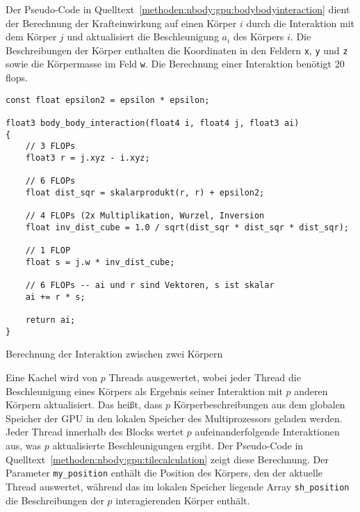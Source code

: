 Der Pseudo-Code in Quelltext~\ref{methoden:nbody:gpu:bodybodyinteraction}
dient der Berechnung der Krafteinwirkung auf einen Körper $i$ durch die
Interaktion mit dem Körper $j$ und aktualisiert die Beschleunigung $a_i$ des
Körpers $i$. Die Beschreibungen der Körper enthalten die Koordinaten in den
Feldern \texttt{x}, \texttt{y} und \texttt{z} sowie die Körpermasse im Feld
\texttt{w}. Die Berechnung einer Interaktion benötigt 20 \glspl{flop}.

\begin{code}
    \begin{verbatim}
const float epsilon2 = epsilon * epsilon;

float3 body_body_interaction(float4 i, float4 j, float3 ai)
{
    // 3 FLOPs
    float3 r = j.xyz - i.xyz;

    // 6 FLOPs
    float dist_sqr = skalarprodukt(r, r) + epsilon2;

    // 4 FLOPs (2x Multiplikation, Wurzel, Inversion 
    float inv_dist_cube = 1.0 / sqrt(dist_sqr * dist_sqr * dist_sqr);

    // 1 FLOP
    float s = j.w * inv_dist_cube;

    // 6 FLOPs -- ai und r sind Vektoren, s ist skalar
    ai += r * s;

    return ai;
}
    \end{verbatim}
    \caption{Berechnung der Interaktion zwischen zwei Körpern}
    \label{methoden:nbody:gpu:bodybodyinteraction}
\end{code}

Eine Kachel wird von $p$ Threads ausgewertet, wobei jeder Thread die
Beschleunigung eines Körpers als Ergebnis seiner Interaktion mit $p$ anderen
Körpern aktualisiert. Das heißt, dass $p$ Körperbeschreibungen aus dem globalen
Speicher der GPU in den lokalen Speicher des Multiprozessors geladen werden.
Jeder Thread innerhalb des Blocks wertet $p$ aufeinanderfolgende Interaktionen
aus, was $p$ aktualisierte Beschleunigungen ergibt. Der Pseudo-Code in
Quelltext~\ref{methoden:nbody:gpu:tilecalculation} zeigt diese Berechnung. Der
Parameter \texttt{my\_position} enthält die Position des Körpers, den der
aktuelle Thread auswertet, während das im lokalen Speicher liegende Array
\texttt{sh\_position} die Beschreibungen der $p$ interagierenden Körper enthält.


